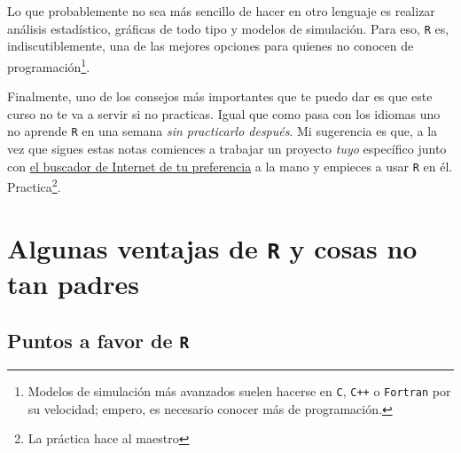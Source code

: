 \documentclass[
]{book}
\begin{document}
Lo que probablemente no sea más sencillo de hacer en otro lenguaje es realizar análisis estadístico, gráficas de todo tipo y modelos de simulación. Para eso, \texttt{R} es, indiscutiblemente, una de las mejores opciones para quienes no conocen de programación\footnote{Modelos de simulación más avanzados suelen hacerse en \texttt{C}, \texttt{C++} o \texttt{Fortran} por su velocidad; empero, es necesario conocer más de programación.}.

Finalmente, uno de los consejos más importantes que te puedo dar es que este curso no te va a servir si no practicas. Igual que como pasa con los idiomas uno no aprende \texttt{R} en una semana \emph{sin practicarlo después}. Mi sugerencia es que, a la vez que sigues estas notas comiences a trabajar un proyecto \emph{tuyo} específico junto con \href{https://yandex.com}{el buscador de Internet de tu preferencia} a la mano y empieces a usar \texttt{R} en él. Practica\footnote{La práctica hace al maestro}.

\hypertarget{algunas-ventajas-de-r-y-cosas-no-tan-padres}{%
\section{\texorpdfstring{Algunas ventajas de \texttt{R} y cosas no tan padres}{Algunas ventajas de R y cosas no tan padres}}\label{algunas-ventajas-de-r-y-cosas-no-tan-padres}}

\hypertarget{puntos-a-favor-de-r}{%
\subsection{\texorpdfstring{Puntos a favor de \texttt{R}}{Puntos a favor de R}}\label{puntos-a-favor-de-r}}
\end{document}
